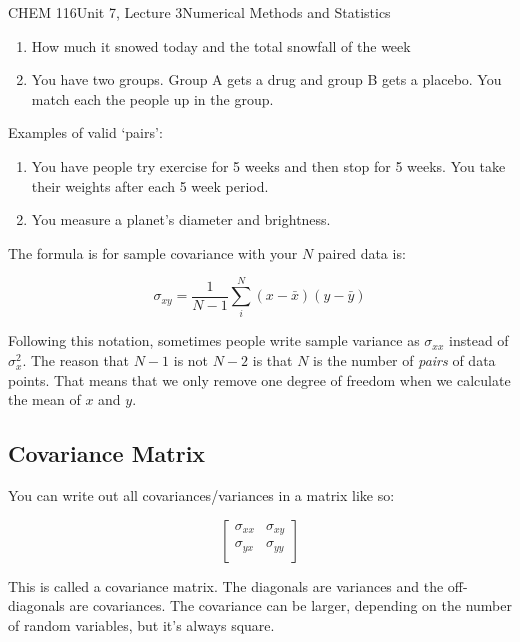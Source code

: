 \documentclass{article}
\begin{document}
\begin{tdoc}{CHEM 116}{Unit 7, Lecture 3}{Numerical Methods and Statistics}
\begin{enumerate}
\item How much it snowed today and the total snowfall of the week

\item You have two groups. Group A gets a drug and group B gets a
  placebo. You match each the people up in the group.

\end{enumerate}

Examples of valid `pairs':

\begin{enumerate}

  \item You have people try exercise for 5 weeks and then stop for 5
    weeks. You take their weights after each 5 week period.

    \item You measure a planet's diameter and brightness.

\end{enumerate}


The formula is for sample covariance with your $N$ paired data is:

\begin{equation}
  \sigma_{xy}= \frac{1}{N - 1} \sum_i^N (x - \bar{x})(y - \bar{y})
\end{equation}

Following this notation, sometimes people write sample variance as
$\sigma_{xx}$ instead of $\sigma_x^2$. The reason that $N - 1$ is not
$N - 2$ is that $N$ is the number of {\it pairs} of data points. That
means that we only remove one degree of freedom when we calculate the
mean of $x$ and $y$.

\subsection{Covariance Matrix}

You can write out all covariances/variances in a matrix like so:

\[
\left[\begin{array}{lr}
\sigma_{xx} & \sigma_{xy}\\
\sigma_{yx} & \sigma_{yy}\\
  \end{array}\right]
\]

This is called a covariance matrix. The diagonals are variances and
the off-diagonals are covariances. The covariance can be larger,
depending on the number of random variables, but it's always square.



\end{tdoc}
\end{document}
